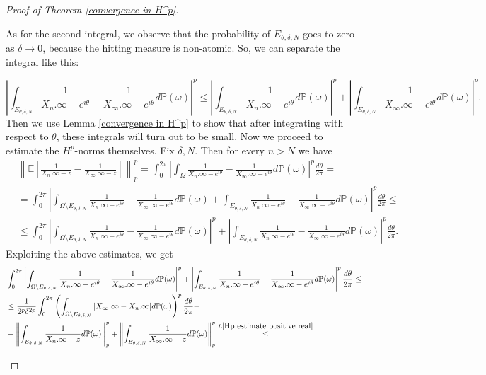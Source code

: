 \documentclass[11pt]{article}
\begin{document}
\begin{proof}[Proof of Theorem \ref{convergence in H^p}]
\begin{itemize}
		As for the second integral, we observe that the probability of $E_{\theta, \delta, N}$ goes to zero as $\delta \rightarrow 0$, because the hitting measure is non-atomic. So, we can separate the integral like this:
		
		\[
		\left| \int_{E_{\theta, \delta, N}} \frac{1}{X_n.\infty - e^{i \theta}} - \frac{1}{X_\infty.\infty - e^{i \theta}} d \mathbb{P}(\omega) \right|^p \le \left| \int_{E_{\theta, \delta, N}} \frac{1}{X_n.\infty - e^{i \theta}} d \mathbb{P}(\omega) \right|^p + \left| \int_{E_{\theta, \delta, N}} \frac{1}{X_\infty.\infty - e^{i \theta}} d \mathbb{P}(\omega) \right|^p .
		\]
		Then we use Lemma \ref{convergence in H^p} to show that after integrating with respect to $\theta$, these integrals will turn out to be small.
		Now we proceed to estimate the $H^p$-norms themselves. Fix $\delta, N$. Then for every $n > N$ we have
		\[
		\begin{aligned}
			& \left\| \mathbb{E} \left[\frac{1}{X_n.\infty - z} - \frac{1}{X_\infty.\infty - z}\right]  \right\|_p^p = \int_0^{2 \pi} \left| \int_{\Omega} \frac{1}{X_n.\infty - e^{i \theta}} - \frac{1}{X_\infty.\infty - e^{i \theta}} d \mathbb{P}(\omega) \right|^p \frac{d \theta}{2 \pi} = \\
			&= \int_0^{2 \pi} \left| \int_{\Omega \setminus E_{\theta, \delta, N}} \frac{1}{X_n.\infty - e^{i \theta}} - \frac{1}{X_\infty.\infty - e^{i \theta}} d \mathbb{P}(\omega) + \int_{E_{\theta, \delta, N}} \frac{1}{X_n.\infty - e^{i \theta}} - \frac{1}{X_\infty.\infty - e^{i \theta}} d \mathbb{P}(\omega) \right|^p \frac{d \theta}{2 \pi} \le \\
			& \le \int_0^{2 \pi} \left| \int_{\Omega \setminus E_{\theta, \delta, N}} \frac{1}{X_n.\infty - e^{i \theta}} - \frac{1}{X_\infty.\infty - e^{i \theta}} d \mathbb{P}(\omega) \right|^p + \left| \int_{E_{\theta, \delta, N}} \frac{1}{X_n.\infty - e^{i \theta}} - \frac{1}{X_\infty.\infty - e^{i \theta}} d \mathbb{P}(\omega) \right|^p \frac{d \theta}{2 \pi}.
		\end{aligned}
		\]
		Exploiting the above estimates, we get
		\[
		\begin{aligned}
			& \int_0^{2 \pi} \left| \int_{\Omega \setminus E_{\theta, \delta, N}} \frac{1}{X_n.\infty - e^{i \theta}} - \frac{1}{X_\infty.\infty - e^{i \theta}} d \mathbb{P}(\omega) \right|^p + \left| \int_{E_{\theta, \delta, N}} \frac{1}{X_n.\infty - e^{i \theta}} - \frac{1}{X_\infty.\infty - e^{i \theta}} d \mathbb{P}(\omega) \right|^p \frac{d \theta}{2 \pi} \le \\ 
			& \le \frac{1}{2^p\delta^{2p}} \int_0^{2 \pi} \left( \int_{\Omega \setminus E_{\theta, \delta, N}} |X_\infty.\infty - X_n.\infty| d \mathbb{P}(\omega) \right)^p \frac{d \theta}{2 \pi} + \\ &+ \left\| \int_{E_{\theta, \delta, N}} \frac{1}{X_n.\infty - z} d \mathbb{P}(\omega) \right\|_p^p + \left\| \int_{E_{\theta, \delta, N}} \frac{1}{X_\infty.\infty - z} d \mathbb{P}(\omega) \right\|_p^p \stackrel{L \ref{Hp estimate positive real}}{\le}\\

\end{aligned}\]
\end{itemize}
\end{proof}
\end{document}
